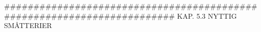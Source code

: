 ######################################################################## 
KAP. 5.3  NYTTIG SMÅTTERIER

